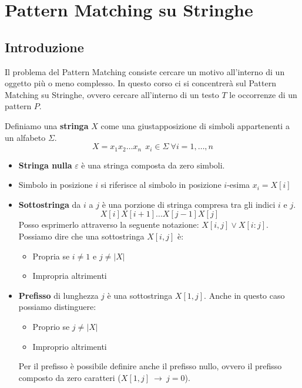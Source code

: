 \chapter{Pattern Matching su Stringhe}
\section{Introduzione}
Il problema del Pattern Matching consiste cercare un motivo all'interno di un oggetto più o meno complesso. In questo corso ci si concentrerà sul Pattern Matching su Stringhe, ovvero cercare all'interno di un testo $T$ le occorrenze di un pattern $P$.
\begin{definizione}
    Definiamo una \textbf{stringa} $X$ come una giustapposizione di simboli appartenenti a un alfabeto $\Sigma$.
    \begin{equation}
        X=x_1x_2\dots x_n \ \ x_i \in \Sigma \ \forall i = 1, \dots, n
    \end{equation}
    \begin{itemize}
        \item \textbf{Stringa nulla} $\varepsilon$ è una stringa composta da zero simboli.
        \item Simbolo in posizione $i$ si riferisce al simbolo in posizione $i$-esima $x_i = X[i]$
        \item \textbf{Sottostringa} da $i$ a $j$ è una porzione di stringa compresa tra gli indici $i$ e $j$. 
        \begin{equation}
            X[i]X[i+1]\dots X[j - 1]X[j]
        \end{equation}
        Posso esprimerlo attraverso la seguente notazione: $X[i, j] \lor X[i:j]$. Possiamo dire che una sottostringa $X[i, j]$ è:
        \begin{itemize}
            \item Propria se $i \neq 1$ e $j \neq |X|$
            \item Impropria altrimenti
        \end{itemize}
        \item \textbf{Prefisso} di lunghezza $j$ è una sottostringa $X[1, j]$. Anche in questo caso possiamo distinguere:
        \begin{itemize}
            \item Proprio se $j \neq |X|$
            \item Improprio altrimenti
        \end{itemize}
        Per il prefisso è possibile definire anche il prefisso nullo, ovvero il prefisso composto da zero caratteri ($X[1, j] \ \to \ j = 0$).

\end{itemize}
\end{definizione}
